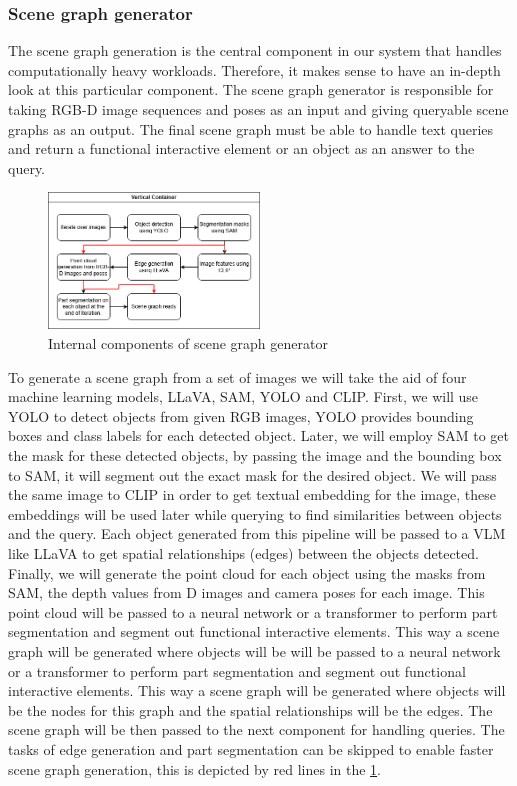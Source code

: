 \subsubsection{Scene graph generator}
The scene graph generation is the central component in our system that handles computationally heavy workloads. Therefore, it makes sense to have an 
in-depth look at this particular component. The scene graph generator is responsible for taking RGB-D image sequences and poses as an input and giving queryable scene graphs
as an output. The final scene graph must be able to handle text queries and return a functional interactive element or an object as an answer to the query. \\
\begin{figure}[ht!]
    \centering
    \includegraphics[width=0.5\textwidth]{content/images/SceneGraphGenerator.png}
    \caption{Internal components of scene graph generator}
    \label{fig:sceneGrahpGenerator}
\end{figure}
To generate a scene graph from a set of images we will take the aid of four machine learning models, LLaVA, SAM, YOLO and CLIP. First, we will use YOLO to detect 
objects from given RGB images, YOLO provides bounding boxes and class labels for each detected object. Later, we will employ SAM to get the mask for these detected 
objects, by passing the image and the bounding box to SAM, it will segment out the exact mask for the desired object. We will pass the same image to CLIP
in order to get textual embedding for the image, these embeddings will be used later while querying to find similarities between objects and the query. 
Each object generated from this pipeline will be passed to a VLM like LLaVA to get spatial relationships (edges) between the objects detected. Finally,
we will generate the point cloud for each object using the masks from SAM, the depth values from D images and camera poses for each image. This point cloud
will be passed to a neural network or a transformer to perform part segmentation and segment out functional interactive elements. This way a scene graph will be generated where objects will be
will be passed to a neural network or a transformer to perform part segmentation and segment out functional interactive elements. This way a scene graph will be generated where objects will be
the nodes for this graph and the spatial relationships will be the edges. The scene graph will be then passed to the next component for handling queries.
The tasks of edge generation and part segmentation can be skipped to enable faster scene graph generation, 
this is depicted by red lines in the \cref{fig:sceneGrahpGenerator}.
